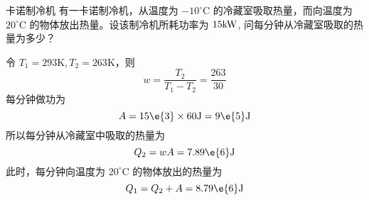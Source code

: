 \begin{example}{卡诺制冷机}
有一卡诺制冷机，从温度为 $-10^{\circ} \mathrm{C}$ 的冷藏室吸取热量，而向温度为 $20^{\circ} \mathrm{C}$ 的物体放出热量。设该制冷机所耗功率为 $15\rm kW$, 问每分钟从冷藏室吸取的热量为多少？

令 $T_1 = 293 \mathrm K , T_2 = 263 \mathrm K $，则
\begin{equation}
w=\frac{T_{2}}{T_{1}-T_{2}}=\frac{263}{30}
\end{equation}
每分钟做功为
\begin{equation}
A=15\e{3} \times 60 \mathrm{J}=9\e{5} \mathrm{J}
\end{equation}
所以每分钟从冷藏室中吸取的热量为
\begin{equation}
Q_{2}=w A=7.89\e{6} \mathrm{J}
\end{equation}
此时，每分钟向温度为 $20^{\circ} \mathrm{C}$ 的物体放出的热量为
\begin{equation}
Q_{1}=Q_{2}+A=8.79\e{6} \mathrm{J}
\end{equation}

\end{example}